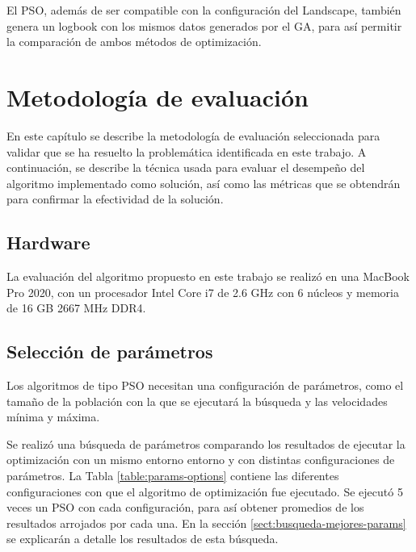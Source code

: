   El PSO, además de ser compatible con la configuración del Landscape, también
  genera un logbook con los mismos datos generados por el GA, para así
  permitir la comparación de ambos métodos de optimización. 

\chapter{Metodología de evaluación}\label{chap:metolodogia}

En este capítulo se describe la metodología de evaluación seleccionada para
validar que se ha resuelto la problemática identificada en este trabajo. A
continuación, se describe la técnica usada para evaluar el desempeño del
algoritmo implementado como solución, así como las métricas que se obtendrán
para confirmar la efectividad de la solución.

\section{Hardware}\label{sect:hardware}

  La evaluación del algoritmo propuesto en este trabajo se realizó en una
  MacBook Pro 2020, con un procesador Intel Core i7 de 2.6 GHz con 6 núcleos y
  memoria de 16 GB 2667 MHz DDR4.

\section{Selección de parámetros}

  Los algoritmos de tipo PSO necesitan una configuración de parámetros, como
  el tamaño de la población con la que se ejecutará la búsqueda y las
  velocidades mínima y máxima.

  Se realizó una búsqueda de parámetros comparando los resultados de ejecutar
  la optimización con un mismo entorno entorno y con distintas
  configuraciones de parámetros. La Tabla \ref{table:params-options} contiene
  las diferentes configuraciones con que el algoritmo de
  optimización fue ejecutado. Se ejecutó 5 veces un PSO con cada
  configuración, para así obtener promedios de los resultados arrojados
  por cada una. En la sección \ref{sect:busqueda-mejores-params} se explicarán
  a detalle los resultados de esta búsqueda.

